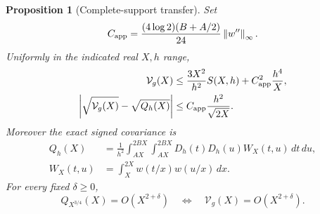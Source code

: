 \documentclass[11pt]{article}
\newtheorem{proposition}[theorem]{Proposition}
\theoremstyle{remark}
\newcommand{\dd}{\,d}
\newcommand{\Vcal}{\mathcal V_g}
\newcommand{\norm}[1]{\left\|#1\right\|}
\numberwithin{equation}{section}
\begin{document}
\begin{proposition}[Complete-support transfer]\label{prop:short}
Set
\begin{equation}\label{eq:capp}
C_{\rm app}=\frac{(4\log2)(B+A/2)}{24}\norm{w''}_\infty.
\end{equation}
Uniformly in the indicated real $X,h$ range,
\begin{align}
\Vcal(X)&\le\frac{3X^2}{h^2}S(X,h)+C_{\rm app}^2\frac{h^4}{X},
\label{eq:gate}\\
\left|\sqrt{\Vcal(X)}-\sqrt{Q_h(X)}\right|
&\le C_{\rm app}\frac{h^2}{\sqrt{2X}}.
\label{eq:norm-error}
\end{align}
Moreover the exact signed covariance is
\begin{equation}\label{eq:covariance}
\begin{split}
Q_h(X)&=\frac1{h^2}\int_{AX}^{2BX}\int_{AX}^{2BX}
D_h(t)D_h(u)W_X(t,u)\dd t\dd u,\\
W_X(t,u)&=\int_X^{2X}w(t/x)w(u/x)\dd x.
\end{split}
\end{equation}
For every fixed $\delta\ge0$,
\begin{equation}\label{eq:Q-equivalence}
Q_{X^{3/4}}(X)=O(X^{2+\delta})
\quad\Longleftrightarrow\quad\Vcal(X)=O(X^{2+\delta}).
\end{equation}
\end{proposition}
\end{document}
